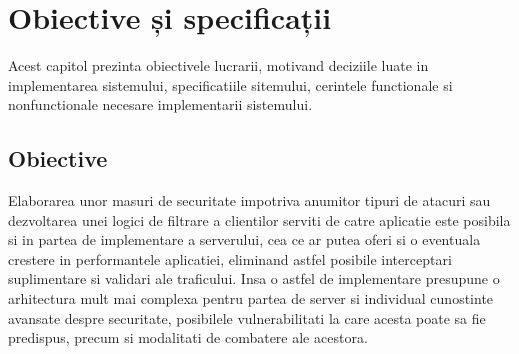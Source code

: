 
 \chapter{Obiective și specificații}
\label{cap:obiective-specificatii}

%

Acest capitol prezinta obiectivele lucrarii, motivand deciziile luate in implementarea sistemului, specificatiile sitemului, cerintele functionale si nonfunctionale necesare implementarii sistemului.

 \section{Obiective}
%
Elaborarea unor masuri de securitate impotriva anumitor tipuri de atacuri sau dezvoltarea unei logici de filtrare a clientilor serviti de catre aplicatie este posibila si in partea de implementare a serverului, cea ce ar putea oferi si o eventuala crestere in performantele aplicatiei, eliminand astfel posibile interceptari suplimentare si validari ale traficului. Insa o astfel de implementare presupune o arhitectura mult mai complexa pentru partea de server si individual cunostinte avansate despre securitate, posibilele vulnerabilitati la care acesta poate sa fie predispus, precum si modalitati de combatere ale acestora. 

